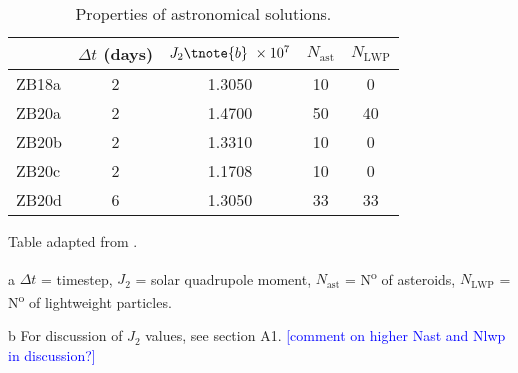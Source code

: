 \documentclass[draft]{agujournal2019}
\newcommand{\ijk}{\textcolor{blue}}
\begin{document}

\begin{table}
\begin{threeparttable}
\caption{Properties of astronomical solutions.\label{tab:astronomical-solutions}}
\centering
\begin{tabular}{lcccc}
 & \(\Delta{}t\) (days) & \(J_{2}\tnote{b}~\times10^{7}\) & \(N_{\text{ast}}\) & \(N_{\text{LWP}}\) \\
\hline
ZB18a & 2 & \num{1.3050} & 10 & 0 \\
ZB20a & 2 & \num{1.4700} & 50 & 40 \\
ZB20b & 2 & \num{1.3310} & 10 & 0 \\
ZB20c & 2 & \num{1.1708} & 10 & 0 \\
ZB20d & 6 & \num{1.3050} & 33 & 33 \\
\end{tabular}
\begin{tablenotes}
  \item Table adapted from .
  \item [a] \(\Delta{}t\) = timestep, \(J_{2}\) = solar quadrupole moment, \(N_{\text{ast}}\) = N\textsuperscript{o} of asteroids, \(N_\text{LWP}\) = N\textsuperscript{o} of lightweight particles.
  \item [b] For discussion of \(J_{2}\) values, see  section A1.
  \ijk{[comment on higher Nast and Nlwp in discussion?]}
\end{tablenotes}
\end{threeparttable}
\end{table}
\end{document}
